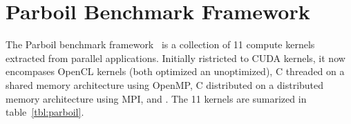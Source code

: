 
\section{Parboil Benchmark Framework}

The Parboil benchmark framework~\cite{todo} is a collection
  of 11 compute kernels extracted from parallel applications.
Initially ristricted to CUDA kernels, it now encompases  
  OpenCL kernels (both optimized an unoptimized), 
  C threaded on a shared memory architecture using OpenMP,
  C distributed on a distributed memory architecture using MPI,
  and .
The 11 kernels are sumarized in table~\ref{tbl:parboil}.

